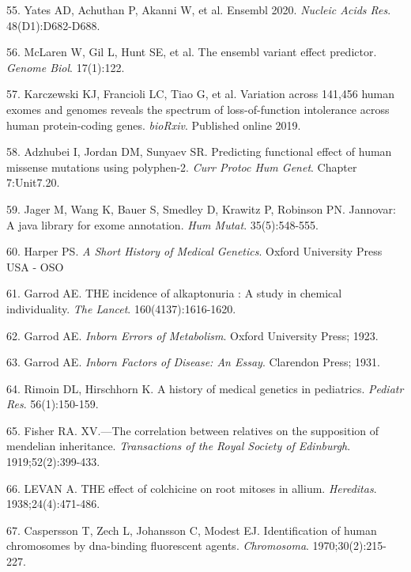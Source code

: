 \documentclass[11pt,letterpaper]{book}
\begin{document}
\leavevmode\hypertarget{ref-yates:2020aa}{}%
55. Yates AD, Achuthan P, Akanni W, et al. Ensembl 2020. \emph{Nucleic Acids Res}. 48(D1):D682-D688.

\leavevmode\hypertarget{ref-mclaren:2016aa}{}%
56. McLaren W, Gil L, Hunt SE, et al. The ensembl variant effect predictor. \emph{Genome Biol}. 17(1):122.

\leavevmode\hypertarget{ref-karczewski:2019aa}{}%
57. Karczewski KJ, Francioli LC, Tiao G, et al. Variation across 141,456 human exomes and genomes reveals the spectrum of loss-of-function intolerance across human protein-coding genes. \emph{bioRxiv}. Published online 2019.

\leavevmode\hypertarget{ref-adzhubei:2013aa}{}%
58. Adzhubei I, Jordan DM, Sunyaev SR. Predicting functional effect of human missense mutations using polyphen-2. \emph{Curr Protoc Hum Genet}. Chapter 7:Unit7.20.

\leavevmode\hypertarget{ref-jager:2014aa}{}%
59. Jager M, Wang K, Bauer S, Smedley D, Krawitz P, Robinson PN. Jannovar: A java library for exome annotation. \emph{Hum Mutat}. 35(5):548-555.

\leavevmode\hypertarget{ref-harper:2008aa}{}%
60. Harper PS. \emph{A Short History of Medical Genetics}. Oxford University Press USA - OSO

\leavevmode\hypertarget{ref-garrod:1902aa}{}%
61. Garrod AE. THE incidence of alkaptonuria : A study in chemical individuality. \emph{The Lancet}. 160(4137):1616-1620.

\leavevmode\hypertarget{ref-garrod:1923aa}{}%
62. Garrod AE. \emph{Inborn Errors of Metabolism}. Oxford University Press; 1923.

\leavevmode\hypertarget{ref-garrod:1931aa}{}%
63. Garrod AE. \emph{Inborn Factors of Disease: An Essay}. Clarendon Press; 1931.

\leavevmode\hypertarget{ref-rimoin:2004aa}{}%
64. Rimoin DL, Hirschhorn K. A history of medical genetics in pediatrics. \emph{Pediatr Res}. 56(1):150-159.

\leavevmode\hypertarget{ref-fisher:1919aa}{}%
65. Fisher RA. XV.---The correlation between relatives on the supposition of mendelian inheritance. \emph{Transactions of the Royal Society of Edinburgh}. 1919;52(2):399-433.

\leavevmode\hypertarget{ref-levan:1938aa}{}%
66. LEVAN A. THE effect of colchicine on root mitoses in allium. \emph{Hereditas}. 1938;24(4):471-486.

\leavevmode\hypertarget{ref-caspersson:1970aa}{}%
67. Caspersson T, Zech L, Johansson C, Modest EJ. Identification of human chromosomes by dna-binding fluorescent agents. \emph{Chromosoma}. 1970;30(2):215-227.
\end{document}
